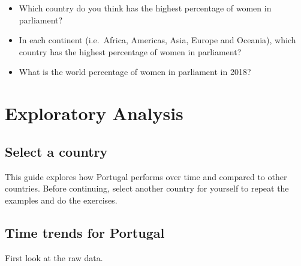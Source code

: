 \documentclass[a4paper,9pt,twocolumn,twoside,printwatermark=false]{pinp}
\providecommand{\tightlist}{%
  \setlength{\itemsep}{0pt}\setlength{\parskip}{0pt}}
\begin{document}
\begin{itemize}
\tightlist
\item
  Which country do you think has the highest percentage of women in
  parliament?
\item
  In each continent (i.e.~Africa, Americas, Asia, Europe and Oceania),
  which country has the highest percentage of women in parliament?
\item
  What is the world percentage of women in parliament in 2018?
\end{itemize}

\section{Exploratory Analysis}\label{exploratory-analysis}

\subsection{Select a country}\label{select-a-country}

This guide explores how Portugal performs over time and compared to
other countries. Before continuing, select another country for yourself
to repeat the examples and do the exercises.

\subsection{Time trends for Portugal}\label{time-trends-for-portugal}

First look at the raw data.
\end{document}
